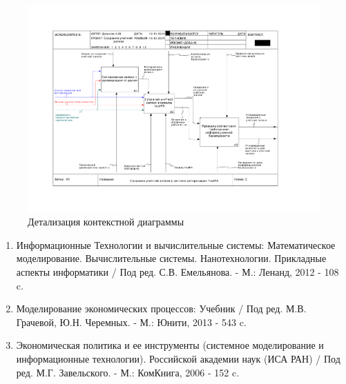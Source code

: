 \documentclass[a4paper,14pt]{extarticle}
\begin{document}
\begin{figure}[h!]
	\centering
	\includegraphics[width=0.9\linewidth]{images/pr-30/page-2}
	\caption{Детализация контекстной диаграммы}
	\label{fig:page-2}
\end{figure}


\newpage
{}
\begin{enumerate}
	\item Информационные Технологии и вычислительные системы: Математическое
	моделирование. Вычислительные системы. Нанотехнологии. Прикладные
	аспекты информатики / Под ред. С.В. Емельянова. - М.: Ленанд, 2012 - 108 c.
	\item  Моделирование экономических процессов: Учебник / Под ред. М.В.
	Грачевой, Ю.Н. Черемных. - М.: Юнити, 2013 - 543 c.
	\item  Экономическая политика и ее инструменты (системное моделирование и
	информационные
	технологии).
	Российской академии наук (ИСА РАН) / Под ред. М.Г. Завельского. - М.:
	КомКнига, 2006 - 152 c.
\end{enumerate}
\end{document}
